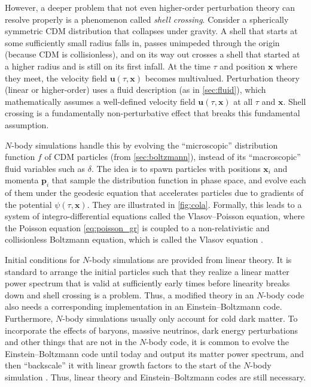\documentclass[USenglish, thumbmarks]{uiophdthesis} %
\newcommand\EB{Einstein--Boltzmann}
\begin{document}
However, a deeper problem that not even higher-order perturbation theory can resolve properly
is a phenomenon called \emph{shell crossing}.
Consider a spherically symmetric CDM distribution that collapses under gravity.
A shell that starts at some sufficiently small radius falls in,
passes unimpeded through the origin (because CDM is collisionless),
and on its way out crosses a shell that started at a higher radius and is still on its first infall.
At the time $\tau$ and position $\mathbf{x}$ where they meet,
the velocity field $\mathbf{u}(\tau, \mathbf{x})$ becomes multivalued.
Perturbation theory (linear or higher-order) uses a fluid description (as in \cref{sec:fluid}),
which mathematically assumes a well-defined velocity field $\mathbf{u}(\tau, \mathbf{x})$ at all $\tau$ and $\mathbf{x}$.
Shell crossing is a fundamentally non-perturbative effect that breaks this fundamental assumption.

$N$-body simulations handle this by evolving the \enquote{microscopic} distribution function $f$ of CDM particles (from \cref{sec:boltzmann}),
instead of its \enquote{macroscopic} fluid variables such as $\delta$.
The idea is to spawn particles with positions $\mathbf{x}_i$ and momenta $\mathbf{p}_i$
that sample the distribution function in phase space,
and evolve each of them under the geodesic equation
that accelerates particles due to gradients of the potential $\psi(\tau,\mathbf{x})$.
They are illustrated in \cref{fig:cola}.
Formally, this leads to a system of integro-differential equations called the Vlasov--Poisson equation,
where the Poisson equation \eqref{eq:poisson_gr} is coupled to a non-relativistic and collisionless Boltzmann equation,
which is called the Vlasov equation \cite[section 12.3]{dodelsonModernCosmology2021a}.

Initial conditions for $N$-body simulations are provided from linear theory.
It is standard to arrange the initial particles such that
they realize a linear matter power spectrum that is valid at sufficiently early times
before linearity breaks down and shell crossing is a problem.
Thus, a modified theory in an $N$-body code also needs a corresponding implementation in an \EB{} code.
Furthermore, $N$-body simulations usually only account for cold dark matter.
To incorporate the effects of baryons, massive neutrinos, dark energy perturbations and other things that are not in the $N$-body code,
it is common to evolve the \EB{} code until today and output its matter power spectrum,
and then \enquote{backscale} it with linear growth factors to the start of the $N$-body simulation \cite{fidlerRelativisticInitialConditions2017a}.
Thus, linear theory and \EB{} codes are still necessary.
\end{document}
